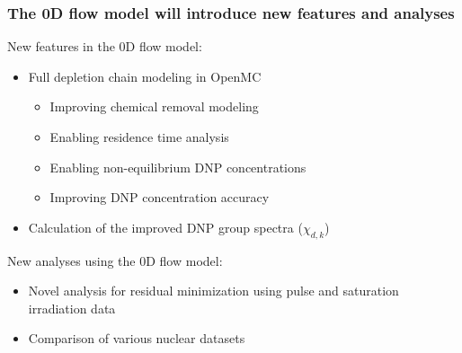 \begin{frame}
  \frametitle{The 0D flow model will introduce new features and analyses}
    \begin{block}{New features in the 0D flow model:}
        \begin{itemize}
            \item Full depletion chain modeling in OpenMC
            \begin{itemize}
                \item Improving chemical removal modeling
                \item Enabling residence time analysis
                \item Enabling non-equilibrium \gls{DNP} concentrations
                \item Improving \gls{DNP} concentration accuracy
            \end{itemize}
            \item Calculation of the improved \gls{DNP} group spectra ($\chi_{d,k}$)
	\end{itemize}
	\end{block}
	\begin{block}{New analyses using the 0D flow model:}
	\begin{itemize}
            \item Novel analysis for residual minimization using pulse and saturation irradiation data \cite{brady1988evaluation, keepin1957delayed}
            \item Comparison of various nuclear datasets \cite{huynh2014calculation, bank2000jef, mathieu2012new}
        \end{itemize}
    \end{block}
\end{frame}
